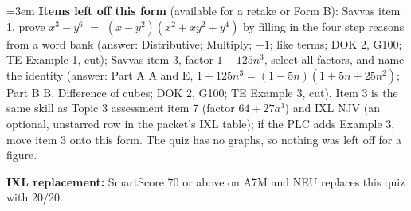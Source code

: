 \documentclass[11pt]{article}
\begin{document}
{\emergencystretch=3em
\textbf{Items left off this form} (available for a retake or Form B): Savvas item 1, prove \mbox{$x^3-y^6$} $=$ \mbox{$(x-y^2)(x^2+xy^2+y^4)$} by filling in the four step reasons from a word bank (answer: Distributive; Multiply; $-1$; like terms; DOK 2, G100; TE Example 1, cut); Savvas item 3, factor $1-125n^3$, select all factors, and name the identity (answer: Part A A and E, $1-125n^3=(1-5n)(1+5n+25n^2)$; Part B B, Difference of cubes; DOK 2, G100; TE Example 3, cut). Item 3 is the same skill as Topic 3 assessment item 7 (factor $64+27a^3$) and IXL NJV (an optional, unstarred row in the packet's IXL table); if the PLC adds Example 3, move item 3 onto this form. The quiz has no graphs, so nothing was left off for a figure.\par}

\textbf{IXL replacement:} SmartScore 70 or above on A7M and NEU replaces this quiz with 20/20.
\end{document}
